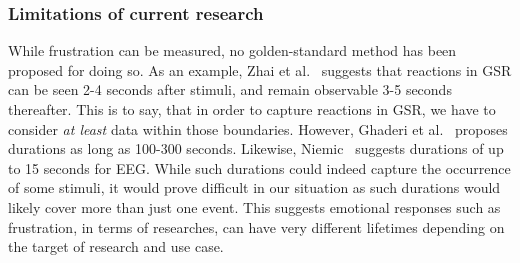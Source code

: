 \subsubsection{Limitations of current research}
While frustration can be measured, no golden-standard method has been proposed for doing so.  As an example, Zhai et
al.~\cite{gsr_len_lat3} suggests that reactions in GSR can be seen 2-4 seconds after stimuli, and remain observable 3-5
seconds thereafter. This is to say, that in order to capture reactions in GSR, we have to consider \textit{at least}
data within those boundaries. However, Ghaderi et al.~\cite{machine_learning_100s_gsr} proposes durations as long as
100-300 seconds. Likewise, Niemic~\cite{studies_of_emotion} suggests durations of up to 15 seconds for EEG. While such
durations could indeed capture the occurrence of some stimuli, it would prove difficult in our situation as such
durations would likely cover more than just one event. This suggests emotional responses such as frustration, in terms
of researches, can have very different lifetimes depending on the target of research and use case.

